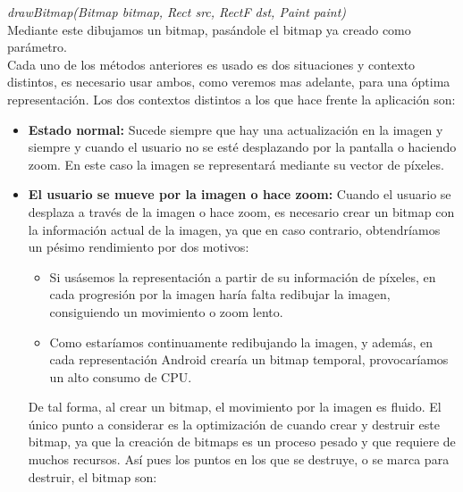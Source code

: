 \emph{drawBitmap(Bitmap bitmap, Rect src, RectF dst, Paint paint)}\\

Mediante este dibujamos un bitmap, pasándole el bitmap ya creado como parámetro.\\

Cada uno de los métodos anteriores es usado es dos situaciones y contexto distintos, es necesario usar ambos, como veremos mas adelante, para una óptima representación. Los dos contextos distintos a los que hace frente la aplicación son:\\

\begin{itemize}
\item \textbf{Estado normal:} Sucede siempre que hay una actualización en la imagen y siempre y cuando el usuario no se esté desplazando por la pantalla o haciendo zoom. En este caso la imagen se representará mediante su vector de píxeles.

\item \textbf{El usuario se mueve por la imagen o hace zoom:} Cuando el usuario se desplaza a través de la imagen o hace zoom, es necesario crear un bitmap con la información actual de la imagen, ya que en caso contrario, obtendríamos un pésimo rendimiento por dos motivos:

\begin{itemize}
\item Si usásemos la representación a partir de su información de píxeles, en cada progresión por la imagen haría falta redibujar la imagen, consiguiendo un movimiento o zoom lento.
\item Como estaríamos continuamente redibujando la imagen, y además, en cada representación Android crearía un bitmap temporal,     provocaríamos un alto consumo de CPU.\\
\end{itemize}

De tal forma, al crear un bitmap, el movimiento por la imagen es fluido. El único punto a considerar es la optimización de cuando crear y destruir este bitmap, ya que la creación de bitmaps es un proceso pesado y que requiere de muchos recursos. Así pues los puntos en los que se destruye, o se marca para destruir, el bitmap son:


\end{itemize}
